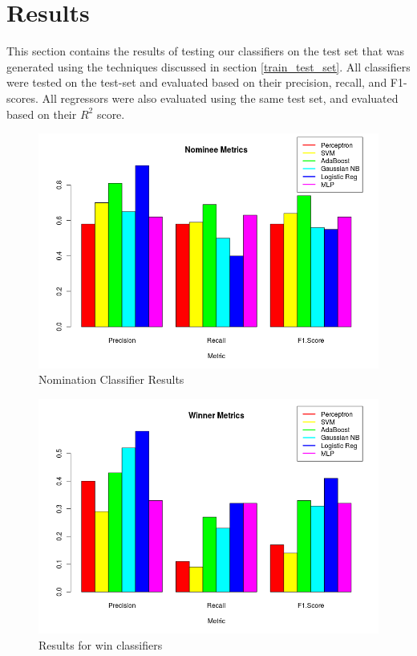\documentclass[journal,transmag]{IEEEtran}
\begin{document}
	\section{Results}
		This section contains the results of testing our classifiers on the test set that was generated using the techniques discussed in section \ref{train_test_set}.
		All classifiers were tested on the test-set and evaluated based on their precision, recall, and F1-scores. All regressors were also evaluated using the same test set, and evaluated based on their $R^2$ score.		
		\begin{figure}
			\centering
			\includegraphics[scale=0.4]{metrics_nom}
			\caption{Nomination Classifier Results}
			\label{fig_metrics_nom}
		\end{figure}
		\begin{figure}
			\centering
			\includegraphics[scale=0.4]{metrics_win}
			\caption{Results for win classifiers}
			\label{fig_metrics_win}
		\end{figure}	
\end{document}
